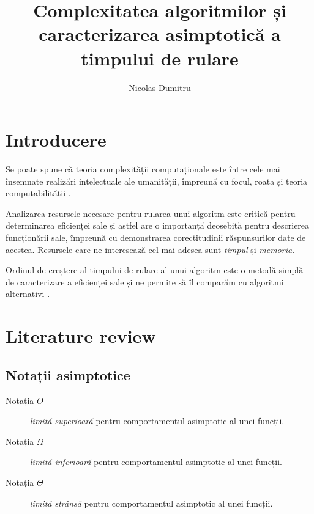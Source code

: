 \documentclass{article}
\title{Complexitatea algoritmilor și caracterizarea asimptotică a timpului de rulare}
\author{Nicolas Dumitru}
\begin{document}
\maketitle

\tableofcontents

\section{Introducere}
Se poate spune că teoria complexității computaționale este între cele mai
însemnate realizări intelectuale ale umanității, împreună cu focul, roata și
teoria computabilității \cite{qcsd}.

Analizarea resursele necesare pentru rularea unui algoritm este critică pentru
determinarea eficienței sale și astfel are o importanță deosebită pentru
descrierea funcționării sale, împreună cu demonstrarea corectitudinii
răspunsurilor date de acestea. Resursele care ne interesează cel mai adesea sunt \emph{timpul}
și \emph{memoria}.


Ordinul de creștere al timpului de rulare al unui algoritm este o metodă simplă
de caracterizare a eficienței sale și ne permite să îl comparăm cu algoritmi
alternativi \cite{clrs}.

\section{Literature review} %

\subsection{Notații asimptotice}

\begin{description}
	\item[Notația $O$] \emph{limită superioară} pentru comportamentul asimptotic
	      al unei funcții.
	\item[Notația $\Omega$] \emph{limită inferioară} pentru comportamentul
	      asimptotic al unei funcții.
	\item[Notația $\Theta$] \emph{limită strânsă} pentru comportamentul
	      asimptotic al unei funcții.
\end{description}
\end{document}
